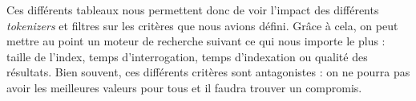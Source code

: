 Ces différents tableaux nous permettent donc de voir l'impact des différents \textit{tokenizers} et filtres sur les critères que nous avions défini. Grâce à cela, on peut mettre au point un moteur de recherche suivant ce qui nous importe le plus : taille de l'index, temps d'interrogation, temps d'indexation ou qualité des résultats. Bien souvent, ces différents critères sont antagonistes : on ne pourra pas avoir les meilleures valeurs pour tous et il faudra trouver un compromis.
